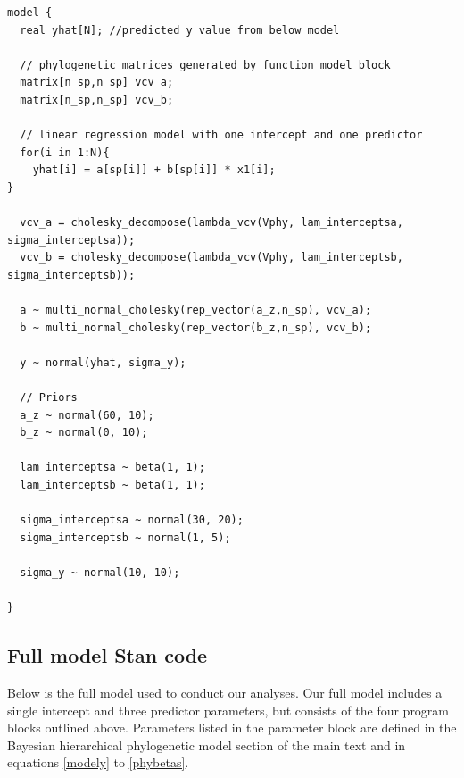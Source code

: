 \documentclass[11pt]{article}
\begin{document}
\begin{verbatim}
model {
  real yhat[N]; //predicted y value from below model
       
  // phylogenetic matrices generated by function model block
  matrix[n_sp,n_sp] vcv_a;     
  matrix[n_sp,n_sp] vcv_b;    
  
  // linear regression model with one intercept and one predictor
  for(i in 1:N){
    yhat[i] = a[sp[i]] + b[sp[i]] * x1[i];
}
			     	
  vcv_a = cholesky_decompose(lambda_vcv(Vphy, lam_interceptsa, sigma_interceptsa));
  vcv_b = cholesky_decompose(lambda_vcv(Vphy, lam_interceptsb, sigma_interceptsb));
 
  a ~ multi_normal_cholesky(rep_vector(a_z,n_sp), vcv_a); 
  b ~ multi_normal_cholesky(rep_vector(b_z,n_sp), vcv_b); 
  
  y ~ normal(yhat, sigma_y);

  // Priors 
  a_z ~ normal(60, 10); 
  b_z ~ normal(0, 10);  
  
  lam_interceptsa ~ beta(1, 1);
  lam_interceptsb ~ beta(1, 1);
  
  sigma_interceptsa ~ normal(30, 20);
  sigma_interceptsb ~ normal(1, 5);
   
  sigma_y ~ normal(10, 10);
  
}
\end{verbatim}

\subsection*{Full model Stan code}
Below is the full model used to conduct our analyses. Our full model includes a single intercept and three predictor parameters, but consists of the four program blocks outlined above. Parameters listed in the parameter block are defined in the Bayesian hierarchical phylogenetic model section of the main text and in equations \ref{modely} to \ref{phybetas}.
\end{document}
